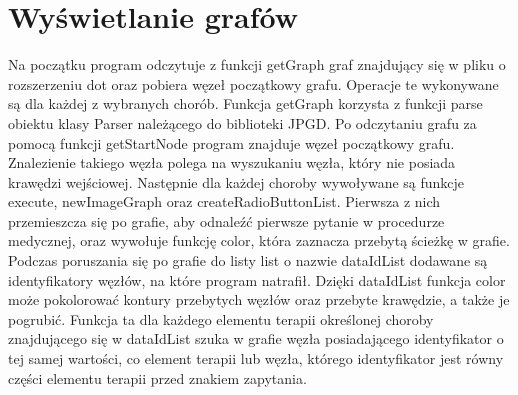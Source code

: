 
\section{Wyświetlanie grafów}

Na początku program odczytuje z funkcji getGraph graf znajdujący się w pliku o rozszerzeniu dot oraz pobiera węzeł początkowy grafu. Operacje te wykonywane są dla każdej z wybranych chorób. Funkcja getGraph korzysta z funkcji parse obiektu klasy Parser należącego do biblioteki JPGD. Po odczytaniu grafu za pomocą funkcji getStartNode program znajduje węzeł początkowy grafu. Znalezienie takiego węzła polega na wyszukaniu węzła, który nie posiada 
krawędzi wejściowej. Następnie dla każdej choroby wywoływane są funkcje execute, newImageGraph oraz createRadioButtonList. Pierwsza z nich przemieszcza się po grafie, 
aby odnaleźć pierwsze pytanie w procedurze medycznej, oraz wywołuje funkcję color, która zaznacza przebytą ścieżkę w grafie. Podczas poruszania się po grafie do listy list o nazwie dataIdList dodawane są identyfikatory węzłów, na które program natrafił. Dzięki dataIdList funkcja color może pokolorować kontury przebytych węzłów oraz przebyte krawędzie, a także je pogrubić. 
Funkcja ta dla każdego elementu terapii określonej choroby znajdującego się w dataIdList szuka w grafie węzła posiadającego identyfikator o tej samej wartości, co element terapii lub węzła, którego identyfikator jest równy części elementu terapii przed znakiem zapytania. 
